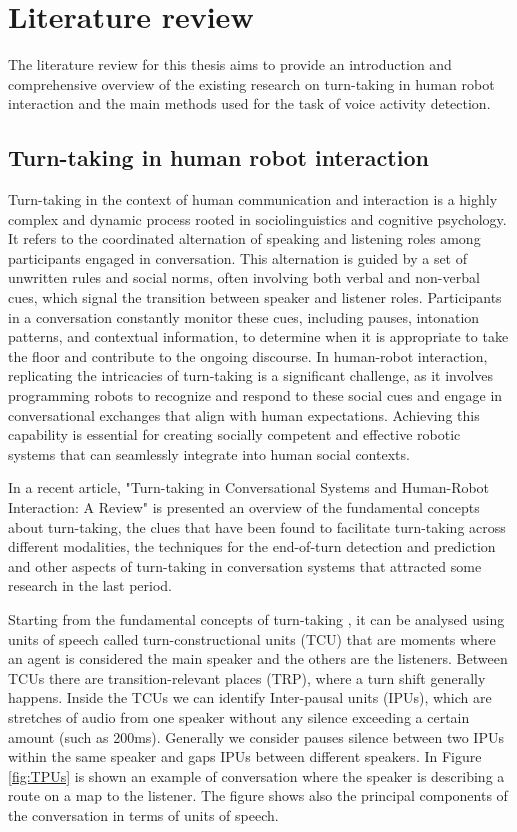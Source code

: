 \documentclass[../main.tex]{subfiles}
\begin{document}
\section{Literature review}
\label{literature review}

The literature review for this thesis aims to provide an introduction and comprehensive overview of the
existing research on turn-taking in human robot interaction and the main methods used for the task of voice activity detection.

\subsection{Turn-taking in human robot interaction}
\label{turn-taking}

Turn-taking in the context of human communication and interaction is a highly complex and dynamic process rooted in sociolinguistics and cognitive psychology. It refers to the coordinated alternation of speaking and listening roles among participants engaged in conversation. This alternation is guided by a set of unwritten rules and social norms, often involving both verbal and non-verbal cues, which signal the transition between speaker and listener roles. Participants in a conversation constantly monitor these cues, including pauses, intonation patterns, and contextual information, to determine when it is appropriate to take the floor and contribute to the ongoing discourse. In human-robot interaction, replicating the intricacies of turn-taking is a significant challenge, as it involves programming robots to recognize and respond to these social cues and engage in conversational exchanges that align with human expectations. Achieving this capability is essential for creating socially competent and effective robotic systems that can seamlessly integrate into human social contexts.

In a recent article, "Turn-taking in Conversational Systems and Human-Robot
Interaction: A Review" \cite{skantze2021turn} is presented an overview of the fundamental concepts about turn-taking, the clues that have been found to facilitate turn-taking across different modalities, the techniques for the end-of-turn detection and prediction and other aspects of turn-taking in conversation systems that attracted some research in the last period. 

Starting from the fundamental concepts of turn-taking \cite{sacks1978simplest}, it can be analysed using units of speech called turn-constructional units (TCU) that are moments where an agent is considered the main speaker and the others are the listeners. Between TCUs there are transition-relevant places (TRP), where a turn shift generally happens. Inside the TCUs we can identify Inter-pausal units (IPUs), which are stretches of audio from one speaker without any silence exceeding a certain amount (such as 200ms). Generally we consider pauses silence between two IPUs within the same speaker and gaps IPUs between different speakers. In Figure \ref{fig:TPUs} is shown an example of conversation where the speaker is describing a route on a map to the listener. The figure shows also the principal components of the conversation in terms of units of speech. 
\end{document}
